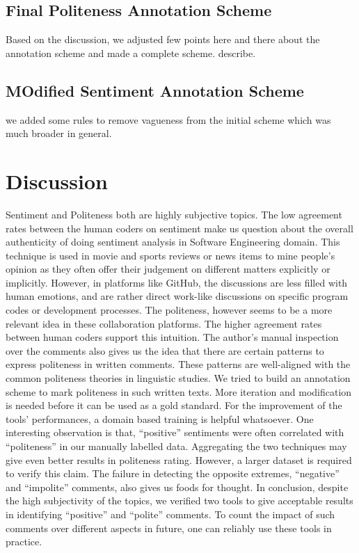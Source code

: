 \subsection{Final Politeness Annotation Scheme}

Based on the discussion, we adjusted few points here and there about the annotation scheme and made a complete scheme. describe.

\subsection{ MOdified Sentiment Annotation Scheme}

we added some rules to remove vagueness from the initial scheme which was much broader in general.

\section{Discussion}

Sentiment and Politeness both are highly subjective topics. The low agreement rates between the human coders on sentiment make us question about the overall authenticity of doing sentiment analysis in Software Engineering domain. This technique is used in movie and sports reviews or news items to mine people's opinion as they often offer their judgement on different matters explicitly or implicitly. However, in platforms like GitHub, the discussions are less filled with human emotions, and are rather direct work-like discussions on specific program codes or development processes.
	The politeness, however seems to be a more relevant idea in these collaboration platforms. The higher agreement rates between human coders support this intuition. The author’s manual inspection over the comments also gives us the idea that there are certain patterns to express politeness in written comments. These patterns are well-aligned with the common politeness theories in linguistic studies. We tried to build an annotation scheme to mark politeness in such written texts. More iteration and modification is needed before it can be used as a gold standard. For the improvement of the tools’ performances, a domain based training is helpful whatsoever.  
	One interesting observation is that, “positive” sentiments were often correlated with “politeness” in our manually labelled data. Aggregating the two techniques may give even better results in politeness rating. However, a larger dataset is required to verify this claim. The failure in detecting the opposite extremes, “negative” and “impolite” comments, also gives us foods for thought.
In conclusion, despite the high subjectivity of the topics, we verified two tools to give acceptable results in  identifying “positive” and “polite” comments. To count the impact of such comments over different aspects in future, one can reliably use these tools in practice.




